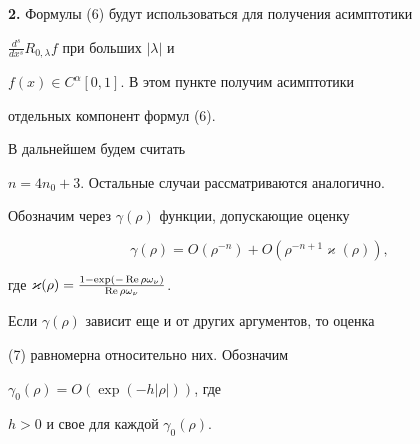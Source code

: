 {\bf 2.} Формулы (6) будут использоваться для получения асимптотики


$\frac {d^s}{dx^s}R_{0,\lambda}f$ при больших $|\lambda|$ и


$f(x)\in C^\alpha[0,1]$. В этом пункте получим асимптотики


отдельных компонент формул (6).





В дальнейшем будем считать


$n=4n_0+3$. Остальные случаи рассматриваются аналогично.


Обозначим через $\gamma(\rho)$ функции, допускающие оценку


\begin{equation}


\gamma(\rho)=O(\rho^{-n})+O(\rho^{-n+1}\varkappa(\rho)),


\end{equation}


где $\varkappa(\rho)= \frac {1-\exp(-\re\rho\omega_\nu)}


{{\rm Re}\,\rho\omega_\nu}$.


Если $\gamma(\rho)$ зависит еще и от других аргументов, то оценка


(7) равномерна относительно них. Обозначим


$\gamma_0(\rho)=O(\exp(-h|\rho|))$, где


$h>0$ и свое для каждой $\gamma_0(\rho)$.





